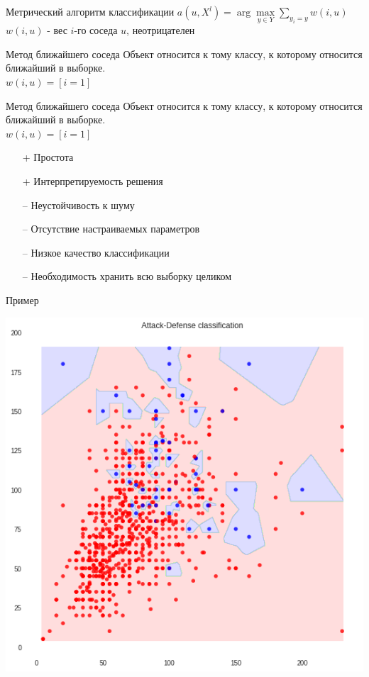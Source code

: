 \documentclass[10pt]{beamer}
\begin{document}
\begin{frame}{Метрический алгоритм классификации}
	${a(u, X^l) = \arg\max\limits_{y \in Y} \sum\limits_{y_i = y} w(i, u)}$\\
	\bigbreak
	$w(i, u)$ - вес $i$-го соседа $u$, неотрицателен\\
\end{frame}

\begin{frame}{Метод ближайшего соседа}
	Объект относится к тому классу, к которому относится ближайший в выборке.\\
	\bigbreak
	${w(i, u) = [i=1]}$\\
\end{frame}

\begin{frame}{Метод ближайшего соседа}
	Объект относится к тому классу, к которому относится ближайший в выборке.\\
	${w(i, u) = [i=1]}$\\
	\bigbreak
	\begin{itemize} [<+- | alert@+>]
		\item[+] Простота
		\item[+] Интерпретируемость решения
	  \bigbreak
		\item[--	] Неустойчивость к шуму
		\item[--	] Отсутствие настраиваемых параметров
		\item[--	] Низкое качество классификации
		\item[--	] Необходимость хранить всю выборку целиком		
	\end{itemize}
\end{frame}

\begin{frame}{Пример}
  \begin{center}
    	\includegraphics[width=\linewidth,height=0.8\textheight,keepaspectratio]{images/attack_vs_defense_fail}  
  \end{center}
\end{frame}
\end{document}
